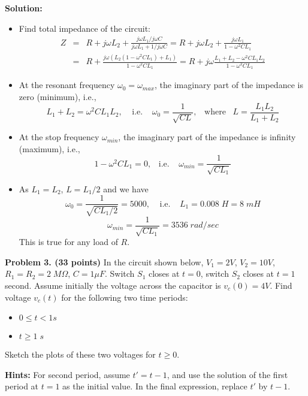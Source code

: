 \begin{enumerate}
  {\bf Solution:}
  \begin{itemize}
  \item Find total impedance of the circuit:
  \begin{eqnarray}
   Z&=&R+j\omega L_2+\frac{j\omega L_1/j\omega C}{j\omega L_1+1/j\omega C}
  	=R+j\omega L_2+\frac{j\omega L_1}{1-\omega^2 CL_1}
  	\nonumber \\
  &=&R+\frac{j\omega(L_2(1-\omega^2CL_1)+L_1)}{1-\omega^2 CL_1}
  =R+j\omega \frac{L_1+L_2-\omega^2CL_1L_2}{1-\omega^2CL_1}
  	\nonumber 
  \end{eqnarray}
  \item At the resonant frequency $\omega_0=\omega_{max}$, the imaginary 
  part of the impedance is zero (minimum), i.e.,
  \[	L_1+L_2=\omega^2CL_1L_2,\;\;\;\;\mbox{i.e.}\;\;\;\;
  	\omega_0=\frac{1}{\sqrt{CL}},\;\;\;\mbox{where}\;\;\;
  	L=\frac{L_1L_2}{L_1+L_2}
  \]
  \item At the stop frequency $\omega_{min}$, the imaginary part of the 
  impedance is infinity (maximum), i.e.,
  \[	1-\omega^2CL_1=0, \;\;\;\mbox{i.e.}\;\;\;\;
  	\omega_{min}=\frac{1}{\sqrt{CL_1}}	\]
  
  \item As $L_1=L_2$, $L=L_1/2$ and we have
  \[ \omega_0=\frac{1}{\sqrt{CL_1/2}}=5000,\;\;\;\;\mbox{i.e.}\;\;\;\;
  	L_1=0.008\;H=8\;mH	\]
  \[ \omega_{min}=\frac{1}{\sqrt{CL_1}}=3536\;rad/sec	\]
  This is true for any load of $R$.
  
  \end{itemize} 

\end{enumerate}


\item {\bf Problem 3. (33 points)} In the circuit shown below, $V_1=2V$,
$V_2=10V$, $R_1=R_2=2\;M\Omega$, $C=1\mu F$. Switch $S_1$ closes at $t=0$, 
switch $S_2$ closes at $t=1$ second. Assume initially the voltage across
the capacitor is $v_c(0)=4V$. Find voltage $v_c(t)$ for the following 
two time periods:
\begin{itemize}
\item $0\le t < 1 s$
\item $t \ge 1\;s$ 
\end{itemize}
Sketch the plots of these two voltages for $t \ge 0$.

{\bf Hints:} For second period, assume $t'=t-1$, and use the solution of
the first period at $t=1$ as the initial value. In the final expression, 
replace $t'$ by $t-1$.


